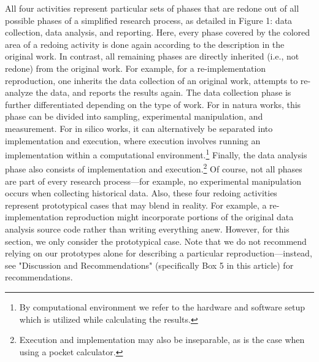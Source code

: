 \documentclass[authordate, meta]{jote-new-article}
\begin{document}
All four activities represent particular sets of phases that are redone out of all possible phases of a simplified research process, as detailed in Figure 1: data collection, data analysis, and reporting. Here, every phase covered by the colored area of a redoing activity is done again according to the description in the original work. In contrast, all remaining phases are directly inherited (i.e., not redone) from the original work. For example, for a re-implementation reproduction, one inherits the data collection of an original work, attempts to re-analyze the data, and reports the results again. The data collection phase is further differentiated depending on the type of work. For in natura works, this phase can be divided into sampling, experimental manipulation, and measurement. For in silico works, it can alternatively be separated into implementation and execution, where execution involves running an implementation within a computational environment.\footnote{ By computational environment we refer to the hardware and software setup which is utilized while calculating the results.} Finally, the data analysis phase also consists of implementation and execution.\footnote{ Execution and implementation may also be inseparable, as is the case when using a pocket calculator.} Of course, not all phases are part of every research process—for example, no experimental manipulation occurs when collecting historical data. Also, these four redoing activities represent prototypical cases that may blend in reality. For example, a re-implementation reproduction might incorporate portions of the original data analysis source code rather than writing everything anew. However, for this section, we only consider the prototypical case. Note that we do not recommend relying on our prototypes alone for describing a particular reproduction—instead, see "Discussion and Recommendations" (specifically Box 5 in this article) for recommendations.
\end{document}
